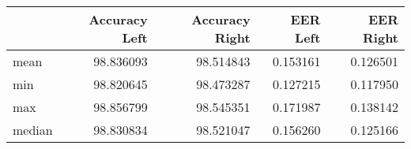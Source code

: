 \begin{tabular}{lrrrr}
\toprule
{} &  Accuracy Left &  Accuracy Right &  EER Left &  EER Right \\
\midrule
mean   &      98.836093 &       98.514843 &  0.153161 &   0.126501 \\
min    &      98.820645 &       98.473287 &  0.127215 &   0.117950 \\
max    &      98.856799 &       98.545351 &  0.171987 &   0.138142 \\
median &      98.830834 &       98.521047 &  0.156260 &   0.125166 \\
\bottomrule
\end{tabular}
